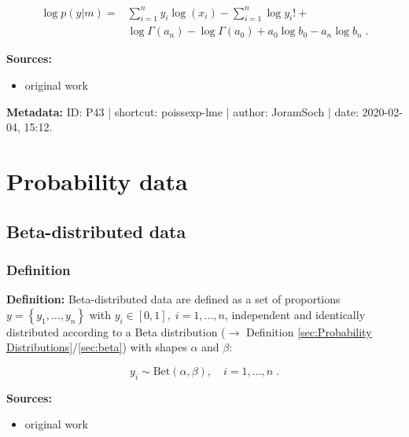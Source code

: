 \documentclass[a4paper,12pt,twoside]{book}
\begin{document}
\begin{equation} \label{eq:poissexp-lme-Poiss-exp-LME-qed}
\begin{split}
\log p(y|m) = &\sum_{i=1}^n y_i \log(x_i) - \sum_{i=1}^n \log y_i ! + \\ 
&\log \Gamma(a_n) - \log \Gamma(a_0) + a_0 \log b_0 - a_n \log b_n \; .
\end{split}
\end{equation}


\vspace{1em}
\textbf{Sources:}
\begin{itemize}
\item original work\end{itemize}


\vspace{1em}
\textbf{Metadata:} ID: P43 | shortcut: poissexp-lme | author: JoramSoch | date: 2020-02-04, 15:12.
\vspace{1em}



\pagebreak
\section{Probability data}

\subsection{Beta-distributed data}

\subsubsection[\textit{Definition}]{Definition} \label{sec:beta-data}
\setcounter{equation}{0}

\textbf{Definition:} Beta-distributed data are defined as a set of proportions $y = \left\lbrace y_1, \ldots, y_n \right\rbrace$ with $y_i \in [0,1], \; i = 1,\ldots,n$, independent and identically distributed according to a Beta distribution ($\rightarrow$ Definition \ref{sec:Probability Distributions}/\ref{sec:beta}) with shapes $\alpha$ and $\beta$:

\begin{equation} \label{eq:beta-data-beta-data}
y_i \sim \mathrm{Bet}(\alpha,\beta), \quad i = 1, \ldots, n \; .
\end{equation}


\vspace{1em}
\textbf{Sources:}
\begin{itemize}
\item original work\end{itemize}
\end{document}
